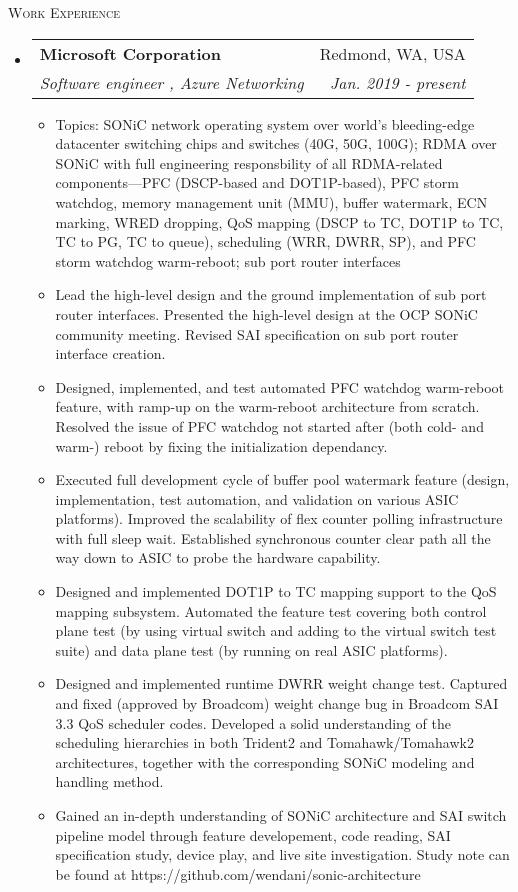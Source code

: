 \documentclass[letterpaper,11pt]{article}
\makeatletter
\newcommand{\resheading}[1]{{\noindent\large \colorbox{mygrey}{
\begin{minipage}{1.0\textwidth}{\textsc{#1 \vphantom{p\^{E}}}}\end{minipage}}}}
\newcommand{\ressubheading}[4]{
\begin{tabular*}{6.69in}{l@{\extracolsep{\fill}}r}
        \textbf{#1} & #2 \\
        \textit{#3} & \textit{#4} \\
\end{tabular*}\vspace{-6pt}
}
\newcommand{\resitem}[1]{\item #1 \vspace{-2pt}}
\makeatother
\begin{document}
\resheading{Work Experience}%
\begin{itemize}
\setlength{\itemindent}{-0.075in}

\item
  \ressubheading{Microsoft Corporation}{Redmond, WA, USA}
  {Software engineer \Romannum{2}, Azure Networking}{Jan. 2019 - present}
  \begin{itemize}
  \resitem{Topics: SONiC network operating system over world's bleeding-edge datacenter switching chips and switches (40G, 50G, 100G);
  RDMA over SONiC with full engineering responsbility of all RDMA-related components---PFC (DSCP-based and DOT1P-based), PFC storm watchdog,
  memory management unit (MMU), buffer watermark, ECN marking,
  WRED dropping, QoS mapping (DSCP to TC, DOT1P to TC, TC to PG, TC to queue), scheduling (WRR, DWRR, SP), and PFC storm watchdog warm-reboot;
  sub port router interfaces}
  \resitem{Lead the high-level design and the ground implementation of sub port router interfaces.
  Presented the high-level design at the OCP SONiC community meeting. Revised SAI specification on sub port router interface creation.}
  \resitem{Designed, implemented, and test automated PFC watchdog warm-reboot feature, with ramp-up on the
  warm-reboot architecture from scratch.
  Resolved the issue of PFC watchdog not started after (both cold- and warm-) reboot by fixing the initialization dependancy.}
  \resitem{Executed full development cycle of buffer pool watermark feature (design, implementation, test automation, and validation on various ASIC platforms).
  Improved the scalability of flex counter polling infrastructure with full sleep wait.
  Established synchronous counter clear path all the way down to ASIC to probe the hardware capability.}
  \resitem{Designed and implemented DOT1P to TC mapping support to the QoS mapping subsystem.
  Automated the feature test covering both control plane test (by using virtual switch and adding to the virtual switch test suite) and data plane
  test (by running on real ASIC platforms).}
  \resitem{Designed and implemented runtime DWRR weight change test.
  Captured and fixed (approved by Broadcom) weight change bug in Broadcom SAI 3.3 QoS scheduler codes.
  Developed a solid understanding of the scheduling hierarchies in both Trident2 and Tomahawk/Tomahawk2 architectures,
  together with the corresponding SONiC modeling and handling method.}
  \resitem{Gained an in-depth understanding of SONiC architecture and SAI switch pipeline model
  through feature developement, code reading, SAI specification study, device play, and live site investigation.
  Study note can be found at https://github.com/wendani/sonic-architecture}
  \end{itemize}


\end{itemize}
\end{document}
